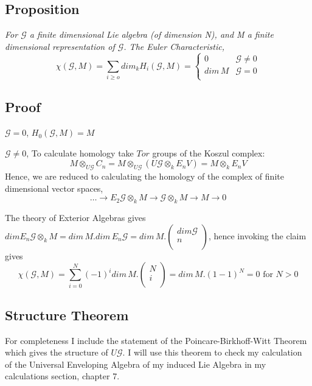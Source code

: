 \subsection*{Proposition}
\emph{For $\mathcal G$ a finite dimensional Lie algebra (of
dimension N), and M a finite dimensional representation of
$\mathcal G$. The Euler Characteristic,
$$\chi(\mathcal G,M) = \sum_{i\geq o} {dim}_k H_i(\mathcal G,M) =
\begin{cases}
  0 & \mathcal G\neq 0 \\
  dim\,M & \mathcal G=0 \\
\end{cases}$$}

\subsection*{Proof}


\underline{$\mathcal G = 0$}, $H_0 (\mathcal G, M) = M$

\underline{$\mathcal G \neq 0$}, To calculate homology take $Tor$
groups of the Koszul complex:
$$M\otimes_{U\mathcal G} C_n = M\otimes_{U\mathcal G} (U\mathcal
G\otimes_k E_nV) = M\otimes_k E_nV$$ Hence, we are reduced to
calculating the homology of the complex of finite dimensional
vector spaces,
$$\dots \rightarrow E_2\mathcal G\otimes_kM\rightarrow \mathcal
G\otimes_k M\rightarrow M\rightarrow 0$$

The theory of Exterior Algebras gives $dim E_n\mathcal G\otimes_k
M = dim\, M.dim\,E_n\mathcal G = dim\,M.\left(%
\begin{array}{c}
  dim \mathcal G \\
  n \\
\end{array}%
\right)$, hence invoking the claim gives
$$\chi(\mathcal G, M) = \sum_{i=0}^N {(-1)}^i dim\, M.\left(%
\begin{array}{c}
  N \\
  i \\
\end{array}%
\right) = dim\, M.{(1-1)}^N = 0 \text{ for } N>0$$



\subsection{Structure Theorem}\label{df4.3}
For completeness I include the statement of the
Poincare-Birkhoff-Witt Theorem which gives the structure of
$U\mathcal G$. I will use this theorem to check my calculation of
the Universal Enveloping Algebra of my induced Lie Algebra in my
calculations section, chapter 7.


